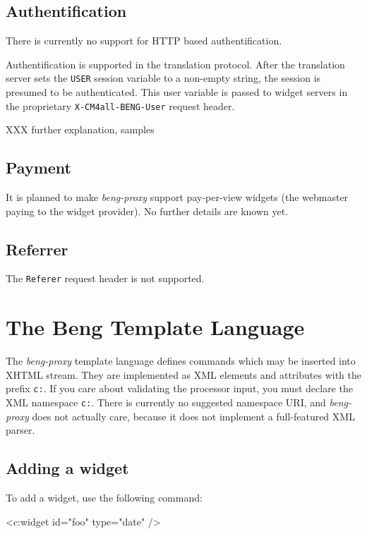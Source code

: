 \documentclass[a4paper,12pt]{article}
\begin{document}
\subsection{Authentification}

There is currently no support for HTTP based authentification.

Authentification is supported in the translation protocol.  After the
translation server sets the \texttt{USER} session variable to a
non-empty string, the session is presumed to be authenticated.  This
user variable is passed to widget servers in the proprietary
\texttt{X-CM4all-BENG-User} request header.

XXX further explanation, samples


\subsection{Payment}

It is planned to make \emph{beng-proxy} support pay-per-view widgets
(the webmaster paying to the widget provider).  No further details are
known yet.


\subsection{Referrer}

The \texttt{Referer} request header is not supported.


\section{The Beng Template Language}
\label{processor}

The \emph{beng-proxy} template language defines commands which may be
inserted into XHTML stream.  They are implemented as XML elements and
attributes with the prefix \texttt{c:}.  If you care about validating
the processor input, you must declare the XML namespace \texttt{c:}.
There is currently no suggested namespace URI, and \emph{beng-proxy}
does not actually care, because it does not implement a full-featured
XML parser.

\subsection{Adding a widget}

To add a widget, use the following command:

\begin{verbatim*}
<c:widget id="foo" type="date" />
\end{verbatim*}
\end{document}
